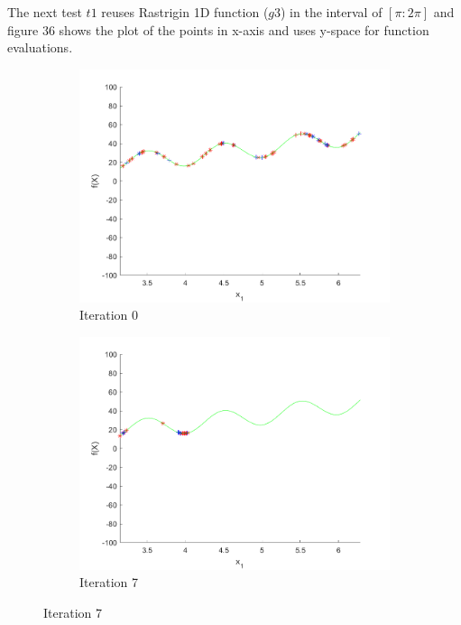 \par The next test $t1$ reuses Rastrigin 1D function ($g3$) in the interval of $[\pi:2\pi]$ and figure 36 shows the plot of the points in x-axis and uses y-space for function evaluations.

\begin{figure}
  \centering
 \begin{subfigure}[b]{0.4\textwidth}
   \includegraphics[width=\textwidth]{img/smpl/rast1dshft/loa-iter-0}
   \caption{Iteration 0}
   \label{fig:i1-iter-0}
 \end{subfigure}
 \begin{subfigure}[b]{0.4\textwidth}
   \includegraphics[width=\textwidth]{img/smpl/rast1dshft/loa-iter-7}
   \caption{Iteration 7}

\end{subfigure}
\end{figure}

